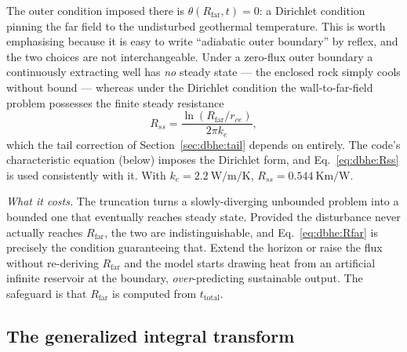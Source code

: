 \documentclass[11pt]{article}
\begin{document}
The outer condition imposed there is $\theta(R_{\mathrm{far}},t)=0$: a Dirichlet
condition pinning the far field to the undisturbed geothermal temperature. This
is worth emphasising because it is easy to write ``adiabatic outer boundary''
by reflex, and the two choices are not interchangeable. Under a zero-flux outer
boundary a continuously extracting well has \emph{no} steady state --- the
enclosed rock simply cools without bound --- whereas under the Dirichlet
condition the wall-to-far-field problem possesses the finite steady resistance
\begin{equation}
R_{ss}=\frac{\ln\!\left(R_{\mathrm{far}}/r_{ce}\right)}{2\pi k_e},
\label{eq:dbhe:Rss}
\end{equation}
which the tail correction of Section~\ref{sec:dbhe:tail} depends on entirely.
The code's characteristic equation (below) imposes the Dirichlet form, and
Eq.~\eqref{eq:dbhe:Rss} is used consistently with it. With
$k_e=\SI{2.2}{\watt\per\metre\per\kelvin}$,
$R_{ss}=\SI{0.544}{\kelvin\metre\per\watt}$.

\emph{What it costs.} The truncation turns a slowly-diverging unbounded problem
into a bounded one that eventually reaches steady state. Provided the
disturbance never actually reaches $R_{\mathrm{far}}$, the two are
indistinguishable, and Eq.~\eqref{eq:dbhe:Rfar} is precisely the condition
guaranteeing that. Extend the horizon or raise the flux without re-deriving
$R_{\mathrm{far}}$ and the model starts drawing heat from an artificial infinite
reservoir at the boundary, \emph{over}-predicting sustainable output. The
safeguard is that $R_{\mathrm{far}}$ is computed from $t_{\mathrm{total}}$.

\subsection{The generalized integral transform}
\label{sec:dbhe:gitt}
\end{document}
